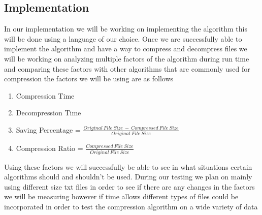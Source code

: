 \documentclass[11pt]{article}
\begin{document}
\subsection*{Implementation}
In our implementation we will be working on implementing the algorithm this will be done using a language
of our choice.  Once we are successfully able to implement the algorithm and have a way to compress and 
decompress files we will be working on analyzing multiple factors of the algorithm during run time and
comparing these factors with other algorithms that are commonly used for compression the factors we will be 
using are as follows
      \begin{enumerate}
            \item Compression Time 
            \item Decompression Time
            \item Saving Percentage = $\frac{Original\ File\ Size\ -\ Compressed\ File\ Size}{Original\ File\ Size}$
            \item Compression Ratio = $\frac{Compressed\ File\ Size}{Original\ File\ Size}$
      \end{enumerate}
Using these factors we will successfully be able to see in what situations certain algorithms should and shouldn't be used.
During our testing we plan on mainly using different size txt files in order to see if there are any changes in the factors 
we will be measuring however if time allows different types of files could be
incorporated in order to test the compression algorithm on a wide variety of data



\end{document}
